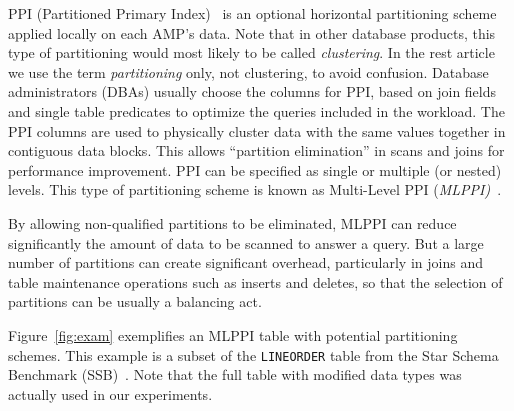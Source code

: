 \documentclass[runningheads]{comsis2}
\begin{document}
PPI (Partitioned Primary Index)~\cite{sinclair:ppi} is an optional horizontal 
partitioning scheme applied locally on each AMP's data. 
Note that in other database products, this type of partitioning would 
most likely to be called {\em clustering}. 
In the rest article we use the term \hbox{{\em partitioning}} only, not clustering, to avoid confusion. 
Database \hbox{administrators} (DBAs) usually choose the columns for PPI, 
based on join fields and single table \hbox{predicates} to optimize the queries included 
in the workload. 
The PPI columns are used to physically cluster data with the same values 
together in contiguous data blocks. 
This allows ``partition elimination'' in scans and joins for performance improvement.
PPI can be specified as single or multiple (or nested) levels. 
This type of partitioning scheme is known as 
Multi-Level PPI ({\em MLPPI)}~\cite{klindt09mlppi}.

By allowing non-qualified partitions to be eliminated, MLPPI can reduce 
significantly the amount of data to be scanned to answer a query. 
But a large number of partitions can create significant overhead, 
particularly in joins and table maintenance operations 
such as inserts and deletes, so that the selection of partitions can be usually a balancing act. 

Figure~\ref{fig:exam} exemplifies an MLPPI table with potential partitioning schemes. 
This example is a subset of the {\tt LINEORDER} table from the Star Schema Benchmark (SSB)~\cite{oneil:ssb}. 
Note that the full table with modified data types was actually used in our experiments. 
\end{document}

